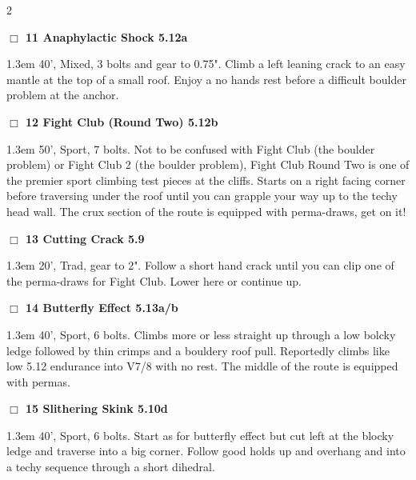 \begin{multicols}{2}
\colorbox{Goldenrod!20}{
\parbox{0.95\linewidth}{
\hspace{-1ex}\textbf{$\Box$
11 Anaphylactic Shock 5.12a  
}}}
\begin{adjustwidth}{1.3em}{}			
40', Mixed, 3 bolts and gear to 0.75". Climb a left leaning crack to an easy mantle at the top of a small roof. Enjoy a no hands rest before a difficult boulder problem at the anchor.
\end{adjustwidth}
\needspace{2em}
\label{rt:Fight Club (Round Two)}
\colorbox{Goldenrod!20}{
\parbox{0.95\linewidth}{
\hspace{-1ex}\textbf{$\Box$
12 Fight Club (Round Two) 5.12b  
}}}
\begin{adjustwidth}{1.3em}{}			
50', Sport, 7 bolts. Not to be confused with Fight Club (the boulder problem) or Fight Club 2 (the boulder problem), Fight Club Round Two is one of the premier sport climbing test pieces at the cliffs. Starts on a right facing corner before traversing under the roof until you can grapple your way up to the techy head wall. The crux section of the route is equipped with perma-draws, get on it!
\end{adjustwidth}
\needspace{2em}
\label{rt:Cutting Crack}
\colorbox{green!20}{
\parbox{0.95\linewidth}{
\hspace{-1ex}\textbf{$\Box$
13 Cutting Crack 5.9  
}}}
\begin{adjustwidth}{1.3em}{}			
20', Trad, gear to 2". Follow a short hand crack until you can clip one of the perma-draws for Fight Club. Lower here or continue up.
\end{adjustwidth}
\needspace{2em}
\label{rt:Butterfly Effect}
\colorbox{Goldenrod!20}{
\parbox{0.95\linewidth}{
\hspace{-1ex}\textbf{$\Box$
14 Butterfly Effect 5.13a/b  
}}}
\begin{adjustwidth}{1.3em}{}			
40', Sport, 6 bolts. Climbs more or less straight up through a low bolcky ledge followed by thin crimps and a bouldery roof pull. Reportedly climbs like low 5.12 endurance into V7/8 with no rest. The middle of the route is equipped with permas.
\end{adjustwidth}
\needspace{2em}
\label{rt:Slithering Skink}
\colorbox{RoyalBlue!20}{
\parbox{0.95\linewidth}{
\hspace{-1ex}\textbf{$\Box$
15 Slithering Skink 5.10d  
}}}
\begin{adjustwidth}{1.3em}{}			
40', Sport, 6 bolts. Start as for butterfly effect but cut left at the blocky ledge and traverse into a big corner. Follow good holds up and overhang and into a techy sequence through a short dihedral.
\end{adjustwidth}
	\end{multicols}
